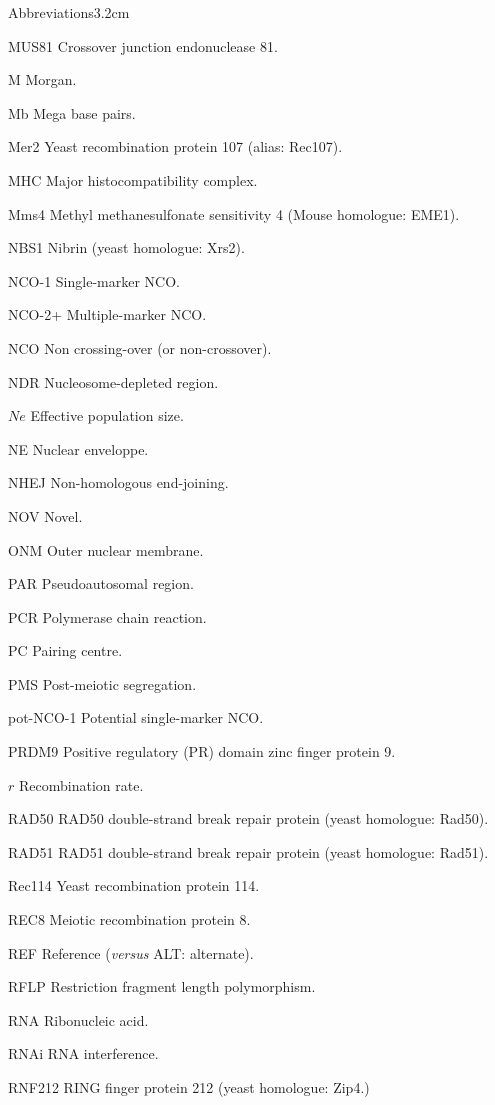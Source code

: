 \begin{mclistof}{Abbreviations}{3.2cm}
\item[MUS81] Crossover junction endonuclease 81.
\item[M] Morgan.
\item[Mb] Mega base pairs.
\item[Mer2] Yeast recombination protein 107 (alias: Rec107).
\item[MHC] Major histocompatibility complex.
\item[Mms4] Methyl methanesulfonate sensitivity 4 (Mouse homologue: EME1).
\item[NBS1] Nibrin (yeast homologue: Xrs2).
\item[NCO-1] Single-marker NCO\@.
\item[NCO-2+] Multiple-marker NCO\@.
\item[NCO] Non crossing-over (or non-crossover).
\item[NDR] Nucleosome-depleted region.
\item[$Ne$] Effective population size.
\item[NE] Nuclear enveloppe.
\item[NHEJ] Non-homologous end-joining.
\item[NOV] Novel.
\item[ONM] Outer nuclear membrane.
\item[PAR] Pseudoautosomal region.
\item[PCR] Polymerase chain reaction.
\item[PC] Pairing centre.
\item[PMS] Post-meiotic segregation.
\item[pot-NCO-1] Potential single-marker NCO\@.
\item[PRDM9] Positive regulatory (PR) domain zinc finger protein 9.
\item[$r$] Recombination rate.
\item[RAD50] RAD50 double-strand break repair protein (yeast homologue: Rad50).
\item[RAD51] RAD51 double-strand break repair protein (yeast homologue: Rad51).
\item[Rec114] Yeast recombination protein 114.
\item[REC8] Meiotic recombination protein 8.
\item[REF] Reference (\textit{versus} ALT\@: alternate).
\item[RFLP] Restriction fragment length polymorphism.
\item[RNA] Ribonucleic acid.
\item[RNAi] RNA interference.
\item[RNF212] RING finger protein 212 (yeast homologue: Zip4.)

\end{mclistof}
